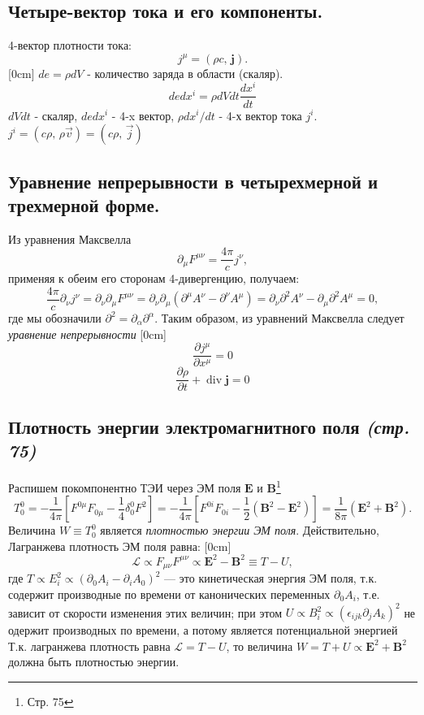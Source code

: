 \documentclass[a4paper,12pt]{article}
\begin{document}
\subsection{Четыре-вектор тока и его компоненты.}
4-вектор плотности тока:
\[
	j^\mu=(\rho c,\,\mathbf{j})
.\] 
[0cm]
$de=\rho dV$ - количество заряда в области (скаляр).
\[
de dx^i=\rho dV dt \frac{dx^i}{dt}
\]
$dV dt$ - скаляр, $de dx^i$ - 4-x вектор, $\rho dx^i/dt$ - 4-х вектор тока $j^i$.
$j^i=\left(c\rho,\,\rho\vec{v}\right)=\left(c\rho,\,\vec{j}\right)$
\subsection{Уравнение непрерывности в четырехмерной и трехмерной форме.}
Из уравнения Максвелла
\[
	\partial_\mu F^{\mu\nu}=\frac{4\pi}{c}j^\nu
,\] 
применяя к обеим его сторонам 4-дивергенцию, получаем:
\[
\frac{4\pi}{c}\partial_\nu j^\nu=\partial_\nu \partial_\mu F^{\mu\nu}=
\partial_\nu \partial_\mu (\partial^{\mu} A^\nu-\partial^\nu A^\mu)=
\partial_\nu \partial^2 A^\nu-\partial_\mu \partial^2 A^\mu=0
,\] 
где мы обозначили $\partial^2=\partial_\alpha \partial^\alpha$. Таким образом,
из уравнений Максвелла следует \emph{уравнение непрерывности}
[0cm]
\[\frac{\partial j^\mu}{\partial x^\mu}=0\]
\[
\frac{\partial \rho}{\partial t}+\operatorname{div} \mathbf{j}=0
\]
\subsection{Плотность энергии электромагнитного поля \emph{(стр. 75)}}
Распишем покомпонентно ТЭИ через ЭМ поля  $\mathbf{E}$ и
$\mathbf{B}$\footnote{Стр. 75}
\[
T_0^0=-\frac{1}{4\pi}\left[ F^{0\mu}F_{0\mu}-\frac{1}{4}\delta_0^0 F^2 \right]=
-\frac{1}{4\pi}\left[ F^{0i}F_{0i}-\frac{1}{2}\left( \mathbf{B}^2-\mathbf{E}^2
\right) \right] =\frac{1}{8\pi}\left( \mathbf{E}^2+\mathbf{B}^2 \right) 
.\] 
Величина $W\equiv T_0^0$ является  \emph{плотностью энергии ЭМ поля}.
Действительно, Лагранжева плотность ЭМ поля равна:
[0cm]
\[
\mathcal{L}\propto F_{\mu\nu}F^{\mu\nu}\propto\mathbf{E}^2-\mathbf{B}^2\equiv
T-U
,\]
где $T \propto E_i^2\propto\left(\partial_0A_i-\partial_iA_0\right)^2$ ---
это кинетическая энергия ЭМ поля,  т.\:к. содержит производные по времени
от канонических переменных $\partial_0 A_i$,  т.\:е. зависит от скорости
изменения этих величин; при этом $U \propto B_i^2 \propto \left( 
\epsilon_{ijk}\partial_j A_k\right) ^2$ не  одержит производных по времени, а
потому является потенциальной энергией
Т.\:к. лагранжева плотность равна $\mathcal{L}=T-U$, то величина $W=T+U\propto
\mathbf{E}^2+\mathbf{B}^2$ должна быть плотностью энергии. 
\end{document}
